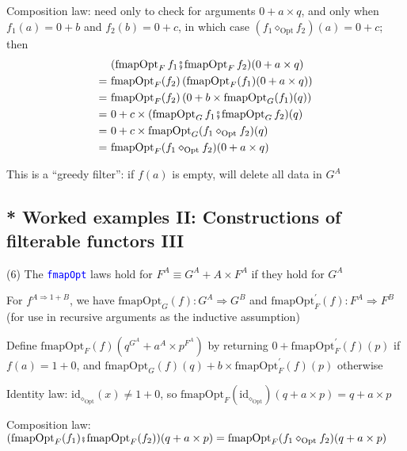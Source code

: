 Composition law: {\footnotesize{}need only to check for arguments
$0+a\times q$, and only when $f_{1}(a)=0+b$ and $f_{2}(b)=0+c$,
in which case $(f_{1}\diamond_{\text{Opt}}f_{2})(a)=0+c$; then 
\begin{align*}
 & (\text{fmapOpt}_{F}\,f_{1}\bef\text{fmapOpt}_{F}\,f_{2})(0+a\times q)\\
=\  & \text{fmapOpt}_{F}(f_{2})\left(\text{fmapOpt}_{F}(f_{1})(0+a\times q)\right)\\
=\  & \text{fmapOpt}_{F}(f_{2})\left(0+b\times\text{fmapOpt}_{G}(f_{1})(q)\right)\\
=\  & 0+c\times(\text{fmapOpt}_{G}\,f_{1}\bef\text{fmapOpt}_{G}\,f_{2})(q)\\
=\  & 0+c\times\text{fmapOpt}_{G}(f_{1}\diamond_{\text{Opt}}f_{2})(q)\\
=\  & \text{fmapOpt}_{F}(f_{1}\diamond_{\text{Opt}}f_{2})(0+a\times q)
\end{align*}
}{\footnotesize\par}

This is a ``greedy filter'': if $f(a)$ is empty, will delete all
data in $G^{A}$


\subsection{{*} Worked examples II: Constructions of filterable functors III}

(6) The \texttt{\textcolor{blue}{\footnotesize{}fmapOpt}} laws hold
for $F^{A}\equiv G^{A}+A\times F^{A}$ if they hold for $G^{A}$

{\footnotesize{}For $f^{A\Rightarrow1+B}$, we have $\text{fmapOpt}_{G}(f):G^{A}\Rightarrow G^{B}$
and $\text{fmapOpt}_{F}^{\prime}(f):F^{A}\Rightarrow F^{B}$ (for
use in recursive arguments as the inductive assumption)}{\footnotesize\par}

{\footnotesize{}Define $\text{fmapOpt}_{F}(f)(q^{G^{A}}+a^{A}\times p^{F^{A}})$
by returning $0+\text{fmapOpt}_{F}^{\prime}(f)(p)$ if $f(a)=1+0$,
and $\text{fmapOpt}_{G}(f)(q)+b\times\text{fmapOpt}_{F}^{\prime}(f)(p)$
otherwise}{\footnotesize\par}

Identity law: {\footnotesize{}$\text{id}_{\diamond_{\text{Opt}}}(x)\neq1+0$},
so {\footnotesize{}$\text{fmapOpt}_{F}(\text{id}_{\diamond_{\text{Opt}}})(q+a\times p)=q+a\times p$ }{\footnotesize\par}

Composition law: {\footnotesize{}$(\text{fmapOpt}_{F}(f_{1})\bef\text{fmapOpt}_{F}(f_{2}))(q+a\times p)=\text{fmapOpt}_{F}(f_{1}\diamond_{\text{Opt}}f_{2})(q+a\times p)$}{\footnotesize\par}

